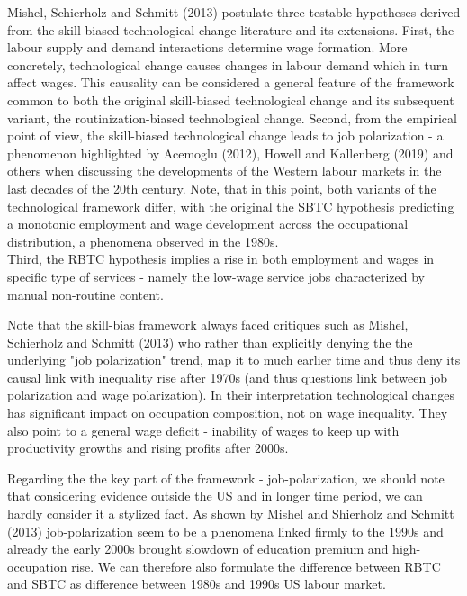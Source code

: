 \documentclass{article}
\begin{document}
Mishel, Schierholz and Schmitt (2013) postulate three testable hypotheses derived from the skill-biased technological change literature and its extensions. First, the labour supply and demand interactions determine wage formation. More concretely, technological change causes changes in labour demand which in turn affect wages. This causality can be considered a general feature of the framework common to both the original skill-biased technological change and its subsequent variant, the routinization-biased technological change. Second, from the empirical point of view, the skill-biased technological change leads to job polarization - a phenomenon highlighted by Acemoglu (2012), Howell and Kallenberg (2019) and others when discussing the developments of the Western labour markets in the last decades of the 20th century. Note, that in this point, both variants of the technological framework differ, with the original the SBTC hypothesis predicting a monotonic employment and wage development across the occupational distribution, a phenomena observed in the 1980s.\\
Third, the RBTC hypothesis implies a rise in both employment and wages in specific type of services - namely the low-wage service jobs characterized by manual non-routine content.

Note that the skill-bias framework always faced critiques such as Mishel, Schierholz and Schmitt (2013) who rather than explicitly denying the the underlying "job polarization" trend, map it to much earlier time and thus deny its causal link with inequality rise after 1970s (and thus questions link between job polarization and wage polarization). In their interpretation technological changes has significant impact on occupation composition, not on wage inequality. They also point to a general wage deficit - inability of wages to keep up with productivity growths and rising profits after 2000s.

Regarding the the key part of the framework - job-polarization, we should note that considering evidence outside the US and in longer time period, we can hardly consider it a stylized fact. As shown by Mishel and Shierholz and Schmitt (2013) job-polarization seem to be a phenomena linked firmly to the 1990s and already the early 2000s brought slowdown of education premium and high-occupation rise. We can therefore also formulate the difference between RBTC and SBTC as difference between 1980s and 1990s US labour market.
\end{document}
